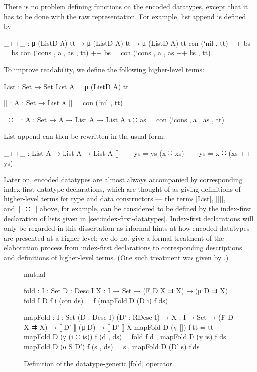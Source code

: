 
There is no problem defining functions on the encoded datatypes, except that it has to be done with the raw representation.
For example, list append is defined by
\begin{code}
_++_ : μ (ListD A) tt → μ (ListD A) tt → μ (ListD A) tt
con (`nil   ,           tt) ++ bs = bs
con (`cons  , a , as ,  tt) ++ bs = con (`cons , a , as ++ bs , tt)
\end{code}
To improve readability, we define the following higher-level terms:
\begin{code}
List : Set → Set
List A = μ (ListD A) tt

[] : {A : Set} → List A
[] = con (`nil , tt)

_∷_ : {A : Set} → A → List A → List A
a ∷ as = con (`cons  , a , as ,  tt)
\end{code}
List append can then be rewritten in the usual form:
\begin{code}
_++_ : List A → List A → List A
[]        ++ ys = ys
(x ∷ xs)  ++ ys = x ∷ (xs ++ ys)
\end{code}
Later on, encoded datatypes are almost always accompanied by corresponding index-first datatype declarations, which are thought of as giving definitions of higher-level terms for type and data constructors --- the terms |List|, |[]|, and~|_∷_| above, for example, can be considered to be defined by the index-first declaration of lists given in \autoref{sec:index-first-datatypes}.
Index-first declarations will only be regarded in this dissertation as informal hints at how encoded datatypes are presented at a higher level; we do not give a formal treatment of the elaboration process from index-first declarations to corresponding descriptions and definitions of higher-level terms.
(One such treatment was given by \citet{Dagand-elaboration}.)

\begin{figure}
\codefigure
\begin{code}
mutual

  fold : {I : Set} {D : Desc I} {X : I → Set} → (Ḟ D X ⇉ X) → (μ D ⇉ X)
  fold {I} {D} f {i} (con ds) = f (mapFold D (D i) f ds)

  mapFold :  {I : Set} (D : Desc I) (D' : RDesc I) →
             {X : I → Set} → (Ḟ D X ⇉ X) → ⟦ D' ⟧ (μ D) → ⟦ D' ⟧ X
  mapFold D (ṿ [])        f tt         = tt
  mapFold D (ṿ (i ∷ is))  f (d  , ds)  = fold f d , mapFold D (ṿ is) f ds
  mapFold D (σ S D')      f (s  , ds)  = s , mapFold D (D' s) f ds
\end{code}
\caption{Definition of the datatype-generic |fold| operator.}
\label{fig:fold}
\end{figure}


